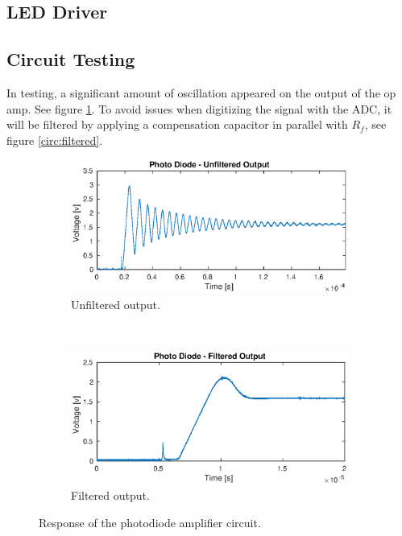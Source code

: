 \subsection{LED Driver}
\subsection{Circuit Testing}
In testing, a significant amount of oscillation appeared on the output of the op amp. See figure \ref{fig:oscillation}. To avoid issues when digitizing the signal with the ADC, it will be filtered by applying a compensation capacitor in parallel with $R_f$, see figure \ref{circ:filtered}.

\begin{figure}[h!]
	\centering
	\begin{subfigure}{\linewidth}
		\includegraphics[width=\linewidth]{images/unfiltered}
		\caption{Unfiltered output.}
		\label{fig:oscillation}
	\end{subfigure}\\
	\begin{subfigure}{\linewidth}
		\includegraphics[width=\linewidth]{images/filtered}
		\caption{Filtered output.}
		\label{fig:nooscillation}
	\end{subfigure}
	\caption{Response of the photodiode amplifier circuit.}
	\label{fig:photoresponse}
\end{figure}

